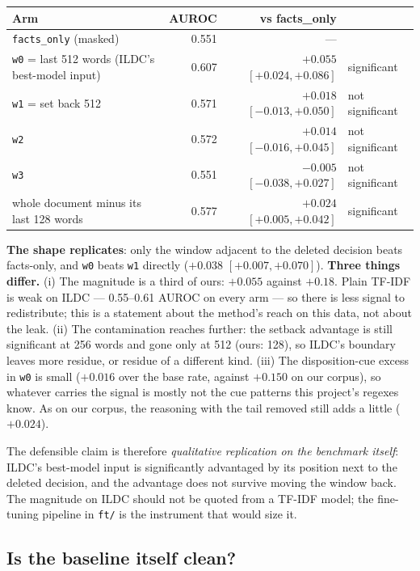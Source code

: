 \documentclass[12pt,a4paper]{article}
\newcommand{\code}[1]{\texttt{\small #1}}
\begin{document}
\begin{center}
\begin{tabular}{@{}lrrl@{}}
\toprule
\textbf{Arm} & \textbf{AUROC} & \textbf{vs facts\_only} & \\
\midrule
\code{facts\_only} (masked) & 0.551 & --- & \\
\code{w0} = last 512 words (ILDC's best-model input) & 0.607 & $+0.055$ $[+0.024, +0.086]$ & significant \\
\code{w1} = set back 512 & 0.571 & $+0.018$ $[-0.013, +0.050]$ & not significant \\
\code{w2} & 0.572 & $+0.014$ $[-0.016, +0.045]$ & not significant \\
\code{w3} & 0.551 & $-0.005$ $[-0.038, +0.027]$ & not significant \\
whole document minus its last 128 words & 0.577 & $+0.024$ $[+0.005, +0.042]$ & significant \\
\bottomrule
\end{tabular}
\end{center}

\textbf{The shape replicates}: only the window adjacent to the deleted decision beats facts-only,
and \code{w0} beats \code{w1} directly ($+0.038$ $[+0.007, +0.070]$). \textbf{Three things differ.}
(i) The magnitude is a third of ours: $+0.055$ against $+0.18$. Plain TF-IDF is weak on ILDC ---
0.55--0.61 AUROC on every arm --- so there is less signal to redistribute; this is a statement about
the method's reach on this data, not about the leak. (ii) The contamination reaches further: the
setback advantage is still significant at 256 words and gone only at 512 (ours: 128), so ILDC's
boundary leaves more residue, or residue of a different kind. (iii) The disposition-cue excess in
\code{w0} is small ($+0.016$ over the base rate, against $+0.150$ on our corpus), so whatever carries
the signal is mostly not the cue patterns this project's regexes know. As on our corpus, the
reasoning with the tail removed still adds a little ($+0.024$).

The defensible claim is therefore \emph{qualitative replication on the benchmark itself}: ILDC's
best-model input is significantly advantaged by its position next to the deleted decision, and the
advantage does not survive moving the window back. The magnitude on ILDC should not be quoted from a
TF-IDF model; the fine-tuning pipeline in \code{ft/} is the instrument that would size it.

\subsection{Is the baseline itself clean?}\label{sec:baseline}
\end{document}

